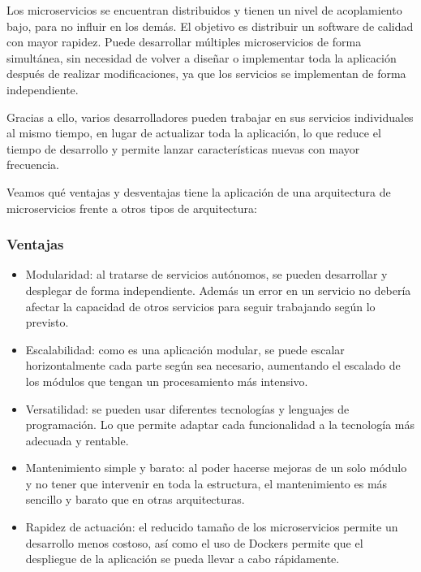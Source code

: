 Los microservicios se encuentran distribuidos y tienen un nivel de acoplamiento bajo, para no influir en los demás. El objetivo es distribuir un software de calidad con mayor rapidez. Puede desarrollar múltiples microservicios de forma simultánea, sin necesidad de volver a diseñar o implementar toda la aplicación después de realizar modificaciones, ya que los servicios se implementan de forma independiente. 

Gracias a ello, varios desarrolladores pueden trabajar en sus servicios individuales al mismo tiempo, en lugar de actualizar toda la aplicación, lo que reduce el tiempo de desarrollo y permite lanzar características nuevas con mayor frecuencia.

Veamos qué ventajas y desventajas tiene la aplicación de una arquitectura de microservicios frente a otros tipos de arquitectura:

\subsubsection{Ventajas}
\begin{itemize}
	\item Modularidad: al tratarse de servicios autónomos, se pueden desarrollar y desplegar de forma independiente. Además un error en un servicio no debería afectar la capacidad de otros servicios para seguir trabajando según lo previsto.
	\item Escalabilidad: como es una aplicación modular, se puede escalar horizontalmente cada parte según sea necesario, aumentando el escalado de los módulos que tengan un procesamiento más intensivo.
	\item Versatilidad: se pueden usar diferentes tecnologías y lenguajes de programación. Lo que permite adaptar cada funcionalidad a la tecnología más adecuada y rentable.
	\item Mantenimiento simple y barato: al poder hacerse mejoras de un solo módulo y no tener que intervenir en toda la estructura, el mantenimiento es más sencillo y barato que en otras arquitecturas.
	\item Rapidez de actuación: el reducido tamaño de los microservicios permite un desarrollo menos costoso, así como el uso de Dockers permite que el despliegue de la aplicación se pueda llevar a cabo rápidamente.
\end{itemize}

